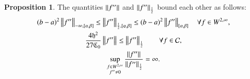 \documentclass[review]{elsarticle}
\theoremstyle{definition}
\renewcommand{\cw}{W}
\newtheorem{prop}[theorem]{Proposition}
\begin{document}
\begin{prop} \label{equivnormprop} The quantities $\norm{f''}$ and $\norm[\frac 12]{f''}$ bound each other as follows:
	\begin{subequations}
		\begin{gather}
		\label{halflessinf}
		(b-a)^2\norm[-\infty,{[\alpha,\beta]}]{f''}  \le \norm[\frac 12,{[\alpha,\beta]}]{f''}  \le (b-a)^2 \norm[{[\alpha,\beta]}]{f''} \quad \forall f \in \cw^{2,\infty}, \\
		\label{inflesshalf}
		\frac{4\fh^2}{27\fC_0} \norm{f''} \le \norm[\frac 12]{f''} \qquad \forall f \in \cc, \\
		\label{infhalfnoteq}
		\sup_{\substack{f \in \cw^{2,\infty}\\ f'' \ne 0}}  \frac{\norm{f''}}{\norm[\frac 12]{f''}} = \infty.
		\end{gather}
	\end{subequations}
\end{prop}
\end{document}
